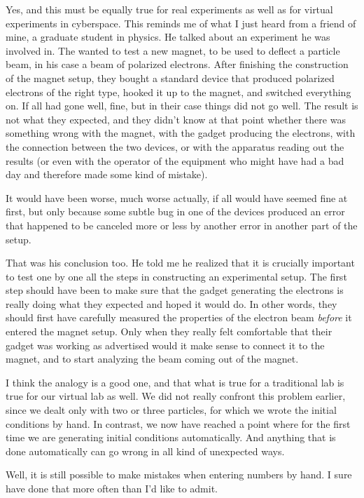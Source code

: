 \bob
Yes, and this must be equally true for real experiments as well as for
virtual experiments in cyberspace.  This reminds me of what I just
heard from a friend of mine, a graduate student in physics.  He talked
about an experiment he was involved in.  The wanted to test a new
magnet, to be used to deflect a particle beam, in his case a beam of
polarized electrons.  After finishing the construction of the magnet
setup, they bought a standard device that produced polarized electrons
of the right type, hooked it up to the magnet, and switched everything
on.  If all had gone well, fine, but in their case things did not go
well.  The result is not what they expected, and they didn't know at
that point whether there was something wrong with the magnet, with the
gadget producing the electrons, with the connection between the two
devices, or with the apparatus reading out the results (or even with
the operator of the equipment who might have had a bad day and
therefore made some kind of mistake).

\alice
It would have been worse, much worse actually, if all would have seemed
fine at first, but only because some subtle bug in one of the devices
produced an error that happened to be canceled more or less by another
error in another part of the setup.

\bob
That was his conclusion too.  He told me he realized that it is
crucially important to test one by one all the steps in constructing an
experimental setup.  The first step should have been to make sure that
the gadget generating the electrons is really doing what they expected
and hoped it would do.  In other words, they should first have carefully
measured the properties of the electron beam {\it before} it entered
the magnet setup.  Only when they really felt comfortable that their
gadget was working as advertised would it make sense to connect
it to the magnet, and to start analyzing the beam coming out of the
magnet.

\carol
I think the analogy is a good one, and that what is true for a
traditional lab is true for our virtual lab as well.  We did not
really confront this problem earlier, since we dealt only with two or
three particles, for which we wrote the initial conditions by hand.  In
contrast, we now have reached a point where for the first time we are
generating initial conditions automatically.  And anything that is
done automatically can go wrong in all kind of unexpected ways.

\alice
Well, it is still possible to make mistakes when entering numbers
by hand.  I sure have done that more often than I'd like to admit.

